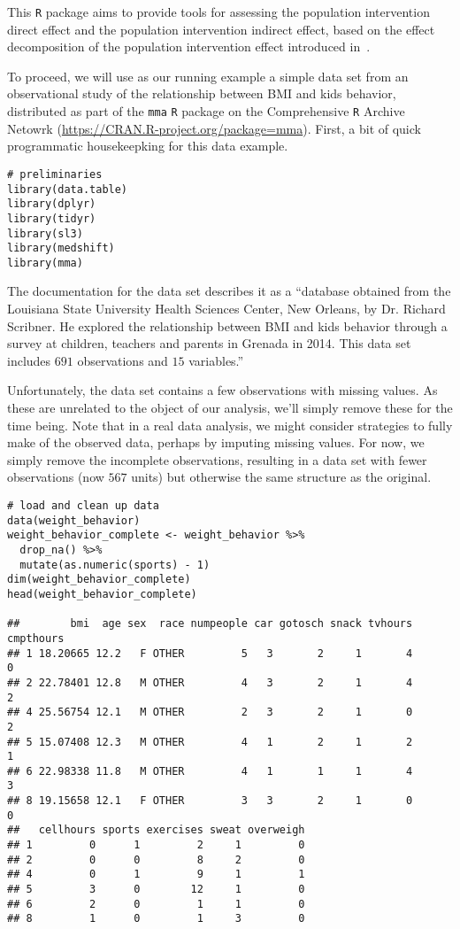 This \texttt{R} package aims to provide tools for assessing the population
intervention direct effect and the population intervention indirect effect,
based on the effect decomposition of the population intervention effect
introduced in~\citet{diaz2020causal}.

To proceed, we will use as our running example a simple data set from an
observational study of the relationship between BMI and kids behavior,
distributed as part of the \texttt{mma} \texttt{R} package on the Comprehensive
\texttt{R} Archive Netowrk (\url{https://CRAN.R-project.org/package=mma}).
First, a bit of quick programmatic housekeepking for this data example.

\begin{lstlisting}
# preliminaries
library(data.table)
library(dplyr)
library(tidyr)
library(sl3)
library(medshift)
library(mma)
\end{lstlisting}

The documentation for the data set describes it as a ``database obtained from
the Louisiana State University Health Sciences Center, New Orleans, by  Dr.
Richard Scribner. He  explored the relationship  between BMI and kids behavior
through a survey at children, teachers and parents in Grenada in 2014. This data
set includes $691$ observations and $15$ variables.''

Unfortunately, the data set contains a few observations with missing values. As
these are unrelated to the object of our analysis, we'll simply remove these for
the time being. Note that in a real data analysis, we might consider strategies
to fully make of the observed data, perhaps by imputing missing values. For now,
we simply remove the incomplete observations, resulting in a data set with fewer
observations (now $567$ units) but otherwise the same structure as the original.

\begin{lstlisting}
# load and clean up data
data(weight_behavior)
weight_behavior_complete <- weight_behavior %>%
  drop_na() %>%
  mutate(as.numeric(sports) - 1)
dim(weight_behavior_complete)
head(weight_behavior_complete)

##        bmi  age sex  race numpeople car gotosch snack tvhours cmpthours
## 1 18.20665 12.2   F OTHER         5   3       2     1       4         0
## 2 22.78401 12.8   M OTHER         4   3       2     1       4         2
## 4 25.56754 12.1   M OTHER         2   3       2     1       0         2
## 5 15.07408 12.3   M OTHER         4   1       2     1       2         1
## 6 22.98338 11.8   M OTHER         4   1       1     1       4         3
## 8 19.15658 12.1   F OTHER         3   3       2     1       0         0
##   cellhours sports exercises sweat overweigh
## 1         0      1         2     1         0
## 2         0      0         8     2         0
## 4         0      1         9     1         1
## 5         3      0        12     1         0
## 6         2      0         1     1         0
## 8         1      0         1     3         0
\end{lstlisting}

